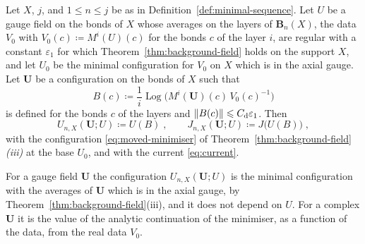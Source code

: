 \documentclass[11pt]{preprint}
\DeclarePairedDelimiter{\norm}{\lVert}{\rVert}
\numberwithin{equation}{section}
\begin{document}
\begin{definition}\label{def:derived-minimiser}
Let $X$, $j$, and $1 \leqslant n \leqslant j$ be as in Definition~\ref{def:minimal-sequence}. Let $U$ be a gauge field on the bonds of $X$ whose averages on the layers of $\mathbf B_n(X)$, the data $V_0$ with $V_0(c) \coloneqq M^i(U)(c)$ for the bonds $c$ of the layer $i$, are regular with a constant $\varepsilon_1$ for which Theorem~\ref{thm:background-field} holds on the support $X$, and let $U_0$ be the minimal configuration for $V_0$ on $X$ which is in the axial gauge. Let $\mathbf U$ be a configuration on the bonds of $X$ such that
\begin{equation}\label{eq:data-deviation}
    B(c) \coloneqq \frac{1}{i}\operatorname{Log}\bigl(M^i(\mathbf U)(c)\,V_0(c)^{-1}\bigr)
\end{equation}
is defined for the bonds $c$ of the layers and $\norm{B(c)} \leqslant C_{\mathrm d}\varepsilon_1$. Then
\begin{equation}\label{eq:derived-minimiser}
    U_{n,X}(\mathbf U; U) \coloneqq U(B)\;,
    \qquad
    J_{n,X}(\mathbf U; U) \coloneqq J\bigl(U(B)\bigr)\;,
\end{equation}
with the configuration \eqref{eq:moved-minimiser} of Theorem~\ref{thm:background-field}\emph{(iii)} at the base $U_0$, and with the current \eqref{eq:current}.
\end{definition}

For a gauge field $\mathbf U$ the configuration $U_{n,X}(\mathbf U; U)$ is the minimal configuration with the averages of $\mathbf U$ which is in the axial gauge, by Theorem~\ref{thm:background-field}(iii), and it does not depend on $U$. For a complex $\mathbf U$ it is the value of the analytic continuation of the minimiser, as a function of the data, from the real data $V_0$.
\end{document}
